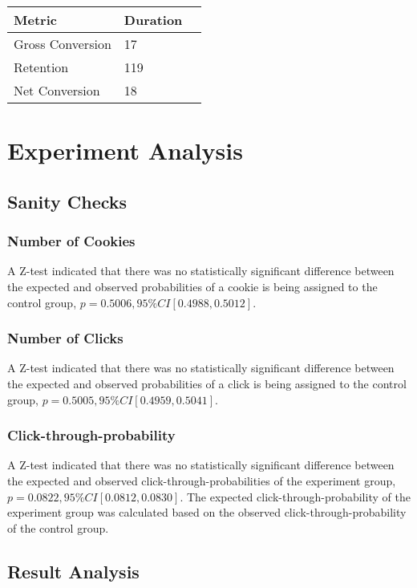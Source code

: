 \documentclass{article}
\begin{document}
\begin{multicols}{2}
\vspace{1em}
\begin{tabular}{ l | l l }
Metric & Duration \\
\hline
Gross Conversion & 17 \\
Retention & 119 \\
Net Conversion & 18
\end{tabular}

\section{Experiment Analysis}

\subsection{Sanity Checks}

\subsubsection{Number of Cookies}

A Z-test indicated that there was no statistically significant difference between the expected and observed probabilities of a cookie is being assigned to the control group, \(p=0.5006, 95\% CI [0.4988, 0.5012]\).

\subsubsection{Number of Clicks}

A Z-test indicated that there was no statistically significant difference between the expected and observed probabilities of a click is being assigned to the control group, \(p=0.5005, 95\% CI [0.4959, 0.5041]\).

\subsubsection{Click-through-probability}

A Z-test indicated that there was no statistically significant difference between the expected and observed click-through-probabilities of the experiment group, \(p=0.0822, 95\% CI [0.0812, 0.0830]\). The expected click-through-probability of the experiment group was calculated based on the observed click-through-probability of the control group.

\subsection{Result Analysis}


\end{multicols}
\end{document}
